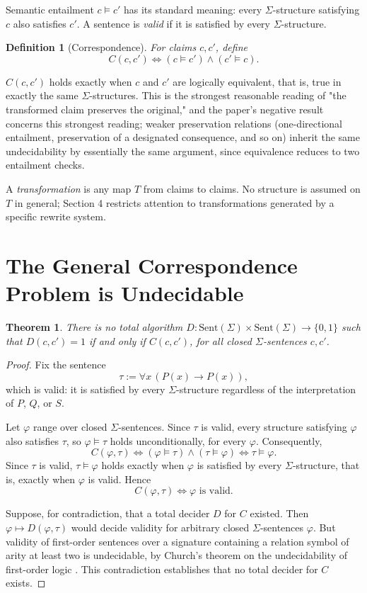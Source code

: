 \documentclass[11pt]{article}
\newtheorem{theorem}{Theorem}
\newtheorem{definition}{Definition}
\begin{document}
Semantic entailment $c \models c'$ has its standard meaning: every $\Sigma$-structure satisfying $c$ also satisfies $c'$. A sentence is \emph{valid} if it is satisfied by every $\Sigma$-structure.

\begin{definition}[Correspondence]
For claims $c, c'$, define
\[
C(c,c') \iff (c \models c') \wedge (c' \models c).
\]
\end{definition}

$C(c,c')$ holds exactly when $c$ and $c'$ are logically equivalent, that is, true in exactly the same $\Sigma$-structures. This is the strongest reasonable reading of "the transformed claim preserves the original," and the paper's negative result concerns this strongest reading; weaker preservation relations (one-directional entailment, preservation of a designated consequence, and so on) inherit the same undecidability by essentially the same argument, since equivalence reduces to two entailment checks.

A \emph{transformation} is any map $T$ from claims to claims. No structure is assumed on $T$ in general; Section 4 restricts attention to transformations generated by a specific rewrite system.

\section{The General Correspondence Problem is Undecidable}

\begin{theorem}
There is no total algorithm $D : \mathrm{Sent}(\Sigma) \times \mathrm{Sent}(\Sigma) \to \{0,1\}$ such that $D(c,c') = 1$ if and only if $C(c,c')$, for all closed $\Sigma$-sentences $c, c'$.
\end{theorem}

\begin{proof}
Fix the sentence
\[
\tau := \forall x\,(P(x) \rightarrow P(x)),
\]
which is valid: it is satisfied by every $\Sigma$-structure regardless of the interpretation of $P$, $Q$, or $S$.

Let $\varphi$ range over closed $\Sigma$-sentences. Since $\tau$ is valid, every structure satisfying $\varphi$ also satisfies $\tau$, so $\varphi \models \tau$ holds unconditionally, for every $\varphi$. Consequently,
\[
C(\varphi, \tau) \iff (\varphi \models \tau) \wedge (\tau \models \varphi) \iff \tau \models \varphi.
\]
Since $\tau$ is valid, $\tau \models \varphi$ holds exactly when $\varphi$ is satisfied by every $\Sigma$-structure, that is, exactly when $\varphi$ is valid. Hence
\[
C(\varphi, \tau) \iff \varphi \text{ is valid}.
\]

Suppose, for contradiction, that a total decider $D$ for $C$ existed. Then $\varphi \mapsto D(\varphi, \tau)$ would decide validity for arbitrary closed $\Sigma$-sentences $\varphi$. But validity of first-order sentences over a signature containing a relation symbol of arity at least two is undecidable, by Church's theorem on the undecidability of first-order logic \cite{church1936}. This contradiction establishes that no total decider for $C$ exists.
\end{proof}
\end{document}

